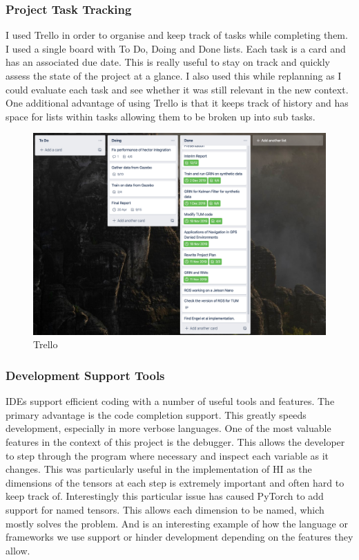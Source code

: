 \documentclass[]{../resources/final_report}
\begin{document}
\subsubsection{Project Task Tracking}

I used Trello in order to organise and keep track of tasks while completing them. I used a single board with To Do, Doing and Done lists. Each task is a card and has an associated due date. This is really useful to stay on track and quickly assess the state of the project at a glance. I also used this while replanning as I could evaluate each task and see whether it was still relevant in the new context. One additional advantage of using Trello is that it keeps track of history and has space for lists within tasks allowing them to be broken up into sub tasks.

\begin{figure}[h!]
  \centering
  \includegraphics[width=\textwidth]{TrelloScreenshot.png}
  \caption{Trello}
  \label{}
\end{figure}


\subsubsection{Development Support Tools}

IDEs support efficient coding with a number of useful tools and features. The primary advantage is the code completion support. This greatly speeds development, especially in more verbose languages. One of the most valuable features in the context of this project is the debugger. This allows the developer to step through the program where necessary and inspect each variable as it changes. This was particularly useful in the implementation of HI as the dimensions of the tensors at each step is extremely important and often hard to keep track of. Interestingly this particular issue has caused PyTorch to add support for named tensors. This allows each dimension to be named, which mostly solves the problem. And is an interesting example of how the language or frameworks we use support or hinder development depending on the features they allow.
\end{document}
